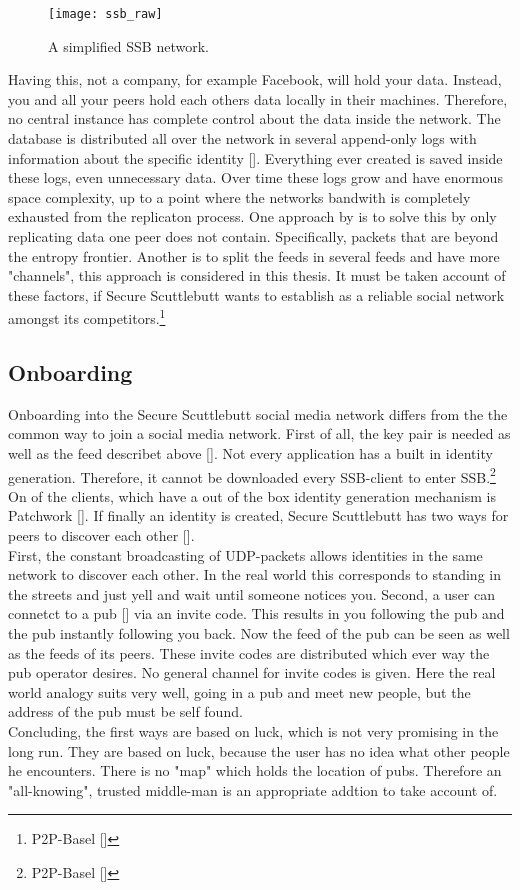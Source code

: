 \begin{figure}
    \centering
    \texttt{[image: ssb\_raw]}
    \caption{A simplified SSB network.}
    \label{fig:sbb-raw}
\end{figure}

Having this, not a company, for example Facebook, will hold your data. Instead, you and all your peers hold each others data locally in their machines. Therefore, no central instance has complete control about the data inside the network. The database is distributed all over the network in several append-only logs with information about the specific identity []. Everything ever created is saved inside these logs, even unnecessary data. Over time these logs grow and have enormous space complexity, up to a point where the networks bandwith is completely exhausted from the replicaton process. One approach by \citet{entropy} is to solve this by only replicating data one peer does not contain. Specifically, packets that are beyond the entropy frontier. Another is to split the feeds in several feeds and have more "channels", this approach is considered in this thesis.
It must be taken account of these factors, if Secure Scuttlebutt wants to establish as a reliable social network amongst its competitors.\footnote{P2P-Basel []}

\subsection{Onboarding}
Onboarding into the Secure Scuttlebutt social media network differs from the the common way to join a social media network. First of all, the key pair is needed as well as the feed describet above []. Not every application has a built in identity generation. Therefore, it cannot be downloaded every SSB-client to enter SSB.\footnote{P2P-Basel []} On of the clients, which have a out of the box identity generation mechanism is Patchwork []. If finally an identity is created, Secure Scuttlebutt has two ways for peers to discover each other []. \\
First, the constant broadcasting of UDP-packets allows identities in the same network to discover each other. In the real world this corresponds to standing in the streets and just yell and wait until someone notices you. Second, a user can connetct to a pub [] via an invite code. This results in you following the pub and the pub instantly following you back. Now the feed of the pub can be seen as well as the feeds of its peers. These invite codes are distributed which ever way the pub operator desires. No general channel for invite codes is given. Here the real world analogy suits very well, going in a pub and meet new people, but the address of the pub must be self found. 
\\
Concluding, the first ways are based on luck, which is not very promising in the long run. They are based on luck, because the user has no idea what other people he encounters. There is no "map" which holds the location of pubs. Therefore an "all-knowing", trusted middle-man is an appropriate addtion to take account of.
